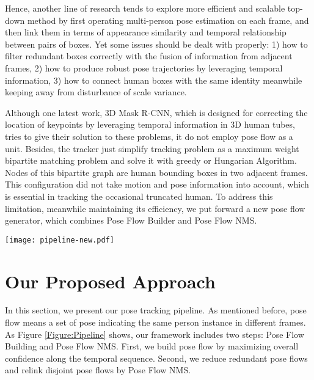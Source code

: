 \documentclass{bmvc2k}
\begin{document}
Hence, another line of research tends to explore more efficient and scalable top-down method by first operating multi-person pose estimation on each frame, and then link them in terms of appearance similarity and temporal relationship between pairs of boxes. Yet some issues should be dealt with properly: 1) how to filter redundant boxes correctly with the fusion of information from adjacent frames, 2) how to produce robust pose trajectories by leveraging temporal information, 3) how to connect human boxes with the same identity meanwhile keeping away from disturbance of scale variance. 

Although one latest work, 3D Mask R-CNN\cite{girdhar2017detect}, which is designed for correcting the location of keypoints by leveraging temporal information in 3D human tubes, tries to give their solution to these problems, it do not employ pose flow as a unit. Besides, the tracker just simplify tracking problem as a maximum weight bipartite matching problem and solve it with greedy or Hungarian Algorithm. Nodes of this bipartite graph are human bounding boxes in two adjacent frames. This configuration did not take motion and pose information into account, which is essential in tracking the occasional truncated human. To address this limitation, meanwhile maintaining its efficiency, we put forward a new pose flow generator, which combines Pose Flow Builder and Pose Flow NMS. 

\begin{figure*}[!ht]
	\begin{center}
		\texttt{[image: pipeline-new.pdf]}
		\caption{Overall Pipeline: 1) Pose Estimator. 2) Pose Flow Builder. 3) Pose Flow NMS. First, we estimate multi-person poses. Second, we build pose flows by maximizing overall confidence and purify them by Pose Flow NMS. Finally, reasonable multi-pose trajectories can be obtained.}
		\label{Figure:Pipeline}
	\end{center}
	\vspace{-8mm}
\end{figure*}

\section{Our Proposed Approach}
\vspace{-2mm}
In this section, we present our pose tracking pipeline. As mentioned before, pose flow means a set of pose indicating the same person instance in different frames. As Figure \ref{Figure:Pipeline} shows, our framework includes two steps: Pose Flow Building and Pose Flow NMS. First, we build pose flow by maximizing overall confidence along the temporal sequence. Second, we reduce redundant pose flows and relink disjoint pose flows by Pose Flow NMS. 
\vspace{-4mm}
\end{document}
